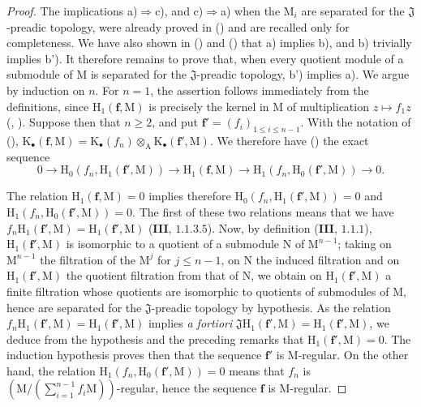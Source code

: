 \begin{proof}
The implications a)$\Rightarrow$c), and c)$\Rightarrow$a) when the $\mathrm{M}_i$ are separated for the $\mathfrak{J}$-preadic topology, were already proved in () and are recalled only for completeness.
We have also shown in () and () that a) implies b), and b) trivially implies b').
It therefore remains to prove that, when every quotient module of a submodule of $\mathrm{M}$ is separated for the $\mathfrak{J}$-preadic topology, b') implies a).
We argue by induction on $n$.
For $n=1$, the assertion follows immediately from the definitions, since $\mathrm{H}_1(\mathbf{f},\mathrm{M})$ is precisely the kernel in $\mathrm{M}$ of multiplication $z\mapsto f_1z$ (, ).
Suppose then that $n\geq2$, and put $\mathbf{f}'=(f_i)_{1\leq i\leq n-1}$.
With the notation of (),
$\mathrm{K}_\bullet(\mathbf{f},\mathrm{M})=\mathrm{K}_\bullet(f_n)\otimes_\mathrm{A}\mathrm{K}_\bullet(\mathbf{f}',\mathrm{M})$.
We therefore have () the exact sequence
\[
  0\longrightarrow\mathrm{H}_0(f_n,\mathrm{H}_1(\mathbf{f}',\mathrm{M}))
  \longrightarrow\mathrm{H}_1(\mathbf{f},\mathrm{M})
  \longrightarrow\mathrm{H}_1(f_n,\mathrm{H}_0(\mathbf{f}',\mathrm{M}))
  \longrightarrow0.
  \tag{19.5.1.1}\label{IV.19.5.1.1}
\]


The relation $\mathrm{H}_1(\mathbf{f},\mathrm{M})=0$ implies therefore $\mathrm{H}_0(f_n,\mathrm{H}_1(\mathbf{f}',\mathrm{M}))=0$ and $\mathrm{H}_1(f_n,\mathrm{H}_0(\mathbf{f}',\mathrm{M}))=0$.
The first of these two relations means that we have $f_n\mathrm{H}_1(\mathbf{f}',\mathrm{M})=\mathrm{H}_1(\mathbf{f}',\mathrm{M})$ \quad (\textbf{III},
$1.1.3.5$). Now, by definition (\textbf{III}, $1.1.1$), $\mathrm{H}_1(\mathbf{f}',\mathrm{M})$ is isomorphic to a quotient of a submodule $\mathrm{N}$ of $\mathrm{M}^{n-1}$; taking on $\mathrm{M}^{n-1}$ the filtration of the $\mathrm{M}^j$ for $j\leqslant n-1$, on $\mathrm{N}$ the induced filtration and on $\mathrm{H}_1(\mathbf{f}',\mathrm{M})$ the quotient filtration from that of $\mathrm{N}$, we obtain on $\mathrm{H}_1(\mathbf{f}',\mathrm{M})$ a finite filtration whose quotients are isomorphic to quotients of submodules of $\mathrm{M}$, hence are separated for the $\mathfrak{J}$-preadic topology by hypothesis.
As the relation $f_n\mathrm{H}_1(\mathbf{f}',\mathrm{M})=\mathrm{H}_1(\mathbf{f}',\mathrm{M})$ implies \emph{a fortiori} $\mathfrak{J}\mathrm{H}_1(\mathbf{f}',\mathrm{M})=\mathrm{H}_1(\mathbf{f}',\mathrm{M})$,
we deduce from the hypothesis and the preceding remarks that $\mathrm{H}_1(\mathbf{f}',\mathrm{M})=0$. The induction hypothesis proves then that the sequence $\mathbf{f}'$ is M-regular. On the other hand, the relation
$\mathrm{H}_1(f_n,\mathrm{H}_0(\mathbf{f}',\mathrm{M}))=0$ means that $f_n$ is $(\mathrm{M}/(\sum_{i=1}^{n-1}f_i\mathrm{M}))$-regular, hence the sequence $\mathbf{f}$ is M-regular.
\end{proof}

